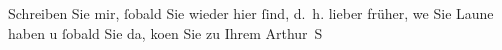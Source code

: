 \pstart
           Schreiben Sie mir,{ }ſobald Sie wieder hier{ }ſind, d. h. lieber früher, we{\geminationn}{ }Sie Laune haben u{ }ſobald Sie da, ko{\geminationm}en Sie zu\pend
           \pstart Ihrem \spacefill\mbox{Arthur S}\pend{}\endnumbering{}  
      